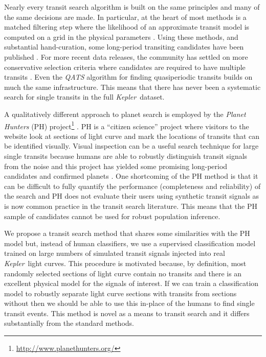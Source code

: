 \documentclass[12pt,preprint]{aastex}
\newcommand{\project}[1]{\textsl{#1}}
\newcommand{\kepler}{\project{Kepler}}
\begin{document}
Nearly every transit search algorithm is built on the same principles and many
of the same decisions are made.
In particular, at the heart of most methods is a matched filtering step where
the likelihood of an approximate transit model is computed on a grid in the
physical parameters \citep[\kepler\ Data Processing
Handbook\footnote{\url{https://archive.stsci.edu/kepler/manuals/KSCI-19081-001_Data_Processing_Handbook.pdf}};][]{%
Petigura:2013, Huang:2013, Dressing:2015, Foreman-Mackey:2015}.
Using these methods, and substantial hand-curation, some long-period
transiting candidates have been published \citep[for example][]{Batalha:2013,
Huang:2013, Kipping:2014a}.
For more recent data releases, the community has settled on more conservative
selection criteria where candidates are required to have multiple transits
\citep[for example][]{Petigura:2013, Burke:2014, Rowe:2015}.
Even the \project{QATS} algorithm \citep{Carter:2013} for finding
quasiperiodic transits builds on much the same infrastructure.
This means that there has never been a systematic search for single transits
in the full \kepler\ dataset.

A qualitatively different approach to planet search is employed by the
\project{Planet Hunters} (PH)
project\footnote{\url{http://www.planethunters.org/}} \citep{Fischer:2012}.
PH is a ``citizen science'' project where visitors to the website look at
sections of light curve and mark the locations of transits that can be
identified visually.
Visual inspection can be a useful search technique for large single transits
because humans are able to robustly distinguish transit signals from the noise
and this project has yielded some promising long-period candidates and
confirmed planets \citep[for example][]{Wang:2013}.
One shortcoming of the PH method is that it can be difficult to fully quantify
the performance (completeness and reliability) of the search and PH does not
evaluate their users using synthetic transit signals as is now common practice
in the transit search literature.
This means that the PH sample of candidates cannot be used for robust
population inference.

We propose a transit search method that shares some similarities with the PH
model but, instead of human classifiers, we use a supervised classification
model trained on large numbers of simulated transit signals injected into
real \kepler\ light curves.
This procedure is motivated because, by definition, most randomly selected
sections of light curve contain no transits and there is an excellent physical
model for the signals of interest.
If we can train a classification model to robustly separate light curve
sections with transits from sections without then we should be able to use
this in-place of the humans to find single transit events.
This method is novel as a means to transit search and it differs substantially
from the standard methods.
\end{document}
